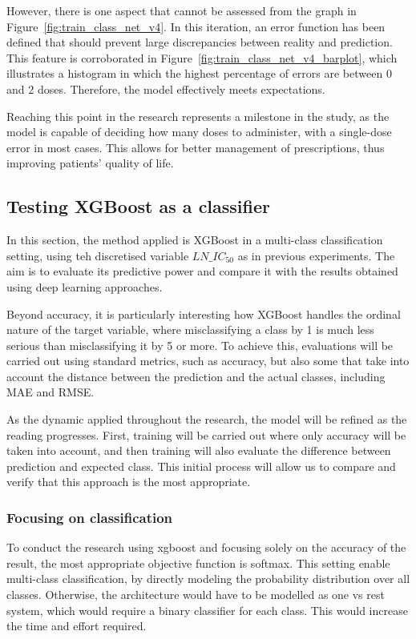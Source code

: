 However, there is one aspect that cannot be assessed from the graph in Figure~\ref{fig:train_class_net_v4}. In this iteration, an error function has been defined that should prevent large discrepancies between reality and prediction. This feature is corroborated in Figure~\ref{fig:train_class_net_v4_barplot}, which illustrates a histogram in which the highest percentage of errors are between 0 and 2 doses. Therefore, the model effectively meets expectations.

Reaching this point in the research represents a milestone in the study, as the model is capable of deciding how many doses to administer, with a single-dose error in most cases. This allows for better management of prescriptions, thus improving patients' quality of life.

\subsection{Testing XGBoost as a classifier}

In this section, the method applied is XGBoost in a multi-class classification setting, using teh discretised variable \(LN\_IC_{50}\) as in previous experiments. The aim is to evaluate its predictive power and compare it with the results obtained using deep learning approaches.

Beyond accuracy, it is particularly interesting how XGBoost handles the ordinal nature of the target variable, where misclassifying a class by 1 is much less serious than misclassifying it by 5 or more. To achieve this, evaluations will be carried out using standard metrics, such as accuracy, but also some that take into account the distance between the prediction and the actual classes, including MAE and RMSE.

As the dynamic applied throughout the research, the model will be refined as the reading progresses. First, training will be carried out where only accuracy will be taken into account, and then training will also evaluate the difference between prediction and expected class. This initial process will allow us to compare and verify that this approach is the most appropriate.

\subsubsection{Focusing on classification}

To conduct the research using xgboost and focusing solely on the accuracy of the result, the most appropriate objective function is softmax. This setting enable multi-class classification, by directly modeling the probability distribution over all classes. Otherwise, the architecture would have to be modelled as one vs rest system, which would require a binary classifier for each class. This would increase the time and effort required.

